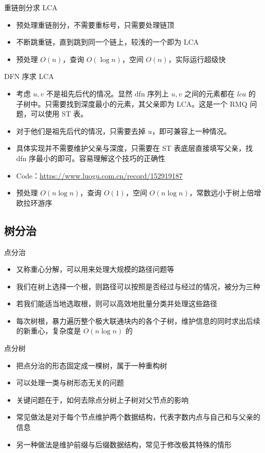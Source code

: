 ﻿\documentclass[aspectratio=169]{ctexbeamer}
\begin{document}
\begin{frame}{重链剖分求 LCA}
    \begin{itemize}
        \item 预处理重链剖分，不需要重标号，只需要处理链顶
        \item 不断跳重链，直到跳到同一个链上，较浅的一个即为 LCA
        \item 预处理 $O(n)$，查询 $O(\log n)$，空间 $O(n)$，实际运行超级快
    \end{itemize}
\end{frame}

\begin{frame}{DFN 序求 LCA}
    \begin{itemize}
        \item 考虑 $u,v$ 不是祖先后代的情况。显然 dfn 序列上 $u,v$ 之间的元素都在 $lca$ 的子树中。只需要找到深度最小的元素，其父亲即为 LCA。这是一个 RMQ 问题，可以使用 ST 表。
        \item 对于他们是祖先后代的情况，只需要去掉 $u$，即可兼容上一种情况。
        \item 具体实现并不需要维护父亲与深度，只需要在 ST 表底层直接填写父亲，找 dfn 序最小的即可。容易理解这个技巧的正确性
        \item Code：\url{https://www.luogu.com.cn/record/152919187}
        \item 预处理 $O(n\log n)$，查询 $O(1)$，空间 $O(n\log n)$，常数远小于树上倍增欧拉环游序
    \end{itemize}
\end{frame}

\subsection{树分治}
\begin{frame}{点分治}
    \begin{itemize}
        \item 又称重心分解，可以用来处理大规模的路径问题等
        \item 我们在树上选择一个根，则路径可以按照是否经过与经过的情况，被分为三种
        \item 若我们能适当地选取根，则可以高效地批量分类并处理这些路径
        \item 每次树根，暴力遍历整个极大联通块内的各个子树，维护信息的同时求出后续的新重心，复杂度是 $O(n\log n)$ 的
    \end{itemize}
\end{frame}
\begin{frame}{点分树}
    \begin{itemize}
        \item 把点分治的形态固定成一棵树，属于一种重构树
        \item 可以处理一类与树形态无关的问题
        \item 关键问题在于，如何去除点分树上子树对父节点的影响
        \item 常见做法是对于每个节点维护两个数据结构，代表字数内点与自己和与父亲的信息
        \item 另一种做法是维护前缀与后缀数据结构，常见于修改极其特殊的情形
    \end{itemize}
\end{frame}
\end{document}
